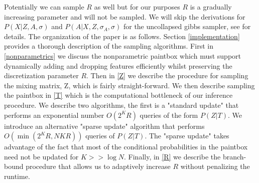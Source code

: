 \documentclass{article}
\begin{document}

Potentially we can sample $R$ as well but for our purposes $R$ is a gradually increasing parameter and will not be sampled.   We will skip the derivations for $P(X|Z,A,\sigma)$ and $P(A|X,Z,\sigma_A,\sigma)$ for the uncollapsed gibbs sampler, see \cite{DGT09} for details.  The organization of the paper is as follows.  
Section \ref{implementation} provides a thorough description of the sampling algorithms.  First in \ref{nonparametrics} we discuss the nonparametric paintbox which must support dynamically adding and dropping features efficiently whilst preserving the discretization parameter $R$.  Then in \ref{Z} we describe the procedure for sampling the mixing matrix, Z, which is fairly straight-forward.  We then describe sampling the paintbox in \ref{T} which is the computational bottleneck of our inference procedure.  We describe two algorithms, the first is a "standard update" that performs an exponential number $O(2^KR)$ queries of the form $P(Z|T)$.  We introduce an alternative "sparse update" algorithm that performs $O(\min(2^KR,NKR))$ queries of $P(Z|T)$.  The "sparse update" takes advantage of the fact that most of the conditional probabilities in the paintbox need not be updated for $K >> \log N$.  Finally, in \ref{R} we describe the branch-bound procedure that allows us to adaptively increase $R$ without penalizing the runtime.  
\end{document}
